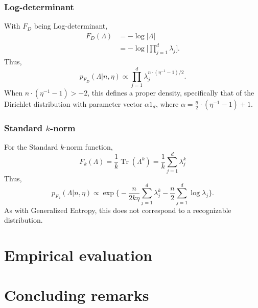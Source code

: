\documentclass[12pt]{article}
\DeclareMathOperator*{\Tr}{Tr}
\theoremstyle{plain}
\begin{document}
\subsubsection*{Log-determinant}

With $F_D$ being Log-determinant,
\begin{align*}
    F_D(\Lambda)
        &= -\log |\Lambda| \\
        &= -\log \Big[ \prod_{j=1}^d \lambda_j \Big].
\end{align*}
Thus,
\[
    p_{F_D}(\Lambda | n, \eta)
        \propto
            \prod_{j=1}^d
                \lambda_j^{n \cdot (\eta^{-1} - 1)/2}.
\]
When $n \cdot (\eta^{-1} - 1) > -2$, this defines a proper density, specifically
that of the Dirichlet distribution with parameter vector $\alpha 1_d$, where
$\alpha = \tfrac{n}{2} \cdot (\eta^{-1} - 1) + 1$.


\subsubsection*{Standard $k$-norm}

For the Standard $k$-norm function,
\[
    F_k(\Lambda)
        = \frac{1}{k} \Tr(\Lambda^k)
        = \frac{1}{k} \sum_{j=1}^d \lambda_j^k
\]
Thus,
\[
    p_{F_k}(\Lambda | n, \eta)
        \propto
            \exp\Big\{
                -
                \frac{n}{2k \eta}
                \sum_{j=1}^{d} \lambda_j^k
                -
                \frac{n}{2}
                \sum_{j=1}^{d} \log \lambda_j
            \Big\}.
\]
As with Generalized Entropy, this does not correspond to a recognizable
distribution.



\section{Empirical evaluation}

\section{Concluding remarks}



\end{document}
